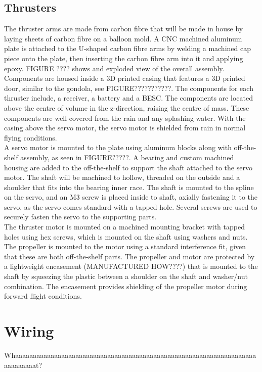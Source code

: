 \documentclass[../main.tex]{subfiles}
\begin{document}
\subsection{Thrusters}
The thruster arms are made from carbon fibre that will be made in house by laying sheets of carbon fibre on a balloon mold. A CNC machined aluminum plate is attached to the U-shaped carbon fibre arms by welding a machined cap piece onto the plate, then inserting the carbon fibre arm into it and applying epoxy. FIGURE ???? shows and exploded view of the overall assembly. Components are housed inside a 3D printed casing that features a 3D printed door, similar to the gondola, see FIGURE???????????. The components for each thruster include, a receiver, a battery and a BESC. The components are located above the centre of volume in the z-direction, raising the centre of mass. These components are well covered from the rain and any splashing water. With the casing above the servo motor, the servo motor is shielded from rain in normal flying conditions.\\

 A servo motor is mounted to the plate using aluminum blocks along with off-the-shelf assembly, as seen in FIGURE?????. A bearing and custom machined housing are added to the off-the-shelf to support the shaft attached to the servo motor. The shaft will be machined to hollow, threaded on the outside and a shoulder that fits into the bearing inner race. The shaft is mounted to the spline on the servo, and an M3 screw is placed inside to shaft, axially fastening it to the servo, as the servo comes standard with a tapped hole. Several screws are used to securely fasten the servo to the supporting parts.\\

The thruster motor is mounted on a machined mounting bracket with tapped holes using hex screws, which is mounted on the shaft using washers and nuts. The propeller is mounted to the motor using a standard interference fit, given that these are both off-the-shelf parts. The propeller and motor are protected by a lightweight encasement (MANUFACTURED HOW????) that is mounted to the shaft by squeezing the plastic between a shoulder on the shaft and washer/nut combination. The encasement provides shielding of the propeller motor during forward flight conditions.\\

\section{Wiring}
Whaaaaaaaaaaaaaaaaaaaaaaaaaaaaaaaaaaaaaaaaaaaaaaaaaaaaaaaaaaaaaaaaaaaaaaaaaaaaat?
\end{document}
